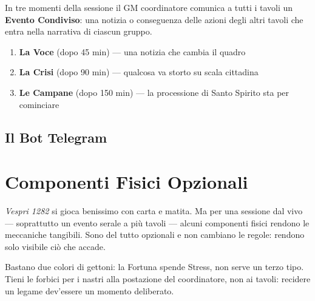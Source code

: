 In tre momenti della sessione il GM coordinatore comunica a tutti i tavoli
un \textbf{Evento Condiviso}: una notizia o conseguenza delle azioni
degli altri tavoli che entra nella narrativa di ciascun gruppo.

\begin{enumerate}[nosep]
  \item \textbf{La Voce} (dopo 45 min) — una notizia che cambia il quadro
  \item \textbf{La Crisi} (dopo 90 min) — qualcosa va storto su scala cittadina
  \item \textbf{Le Campane} (dopo 150 min) — la processione di Santo Spirito
    sta per cominciare
\end{enumerate}

\subsection{Il Bot Telegram}


\secsep

\section{Componenti Fisici Opzionali}

\textit{Vespri 1282} si gioca benissimo con carta e matita. Ma per una
sessione dal vivo — soprattutto un evento serale a più tavoli — alcuni
componenti fisici rendono le meccaniche tangibili. Sono del tutto
opzionali e non cambiano le regole: rendono solo visibile ciò che accade.


Bastano due colori di gettoni: la Fortuna spende Stress, non serve un
terzo tipo. Tieni le forbici per i nastri alla postazione del
coordinatore, non ai tavoli: recidere un legame dev'essere un momento
deliberato.

\filettodoppio
